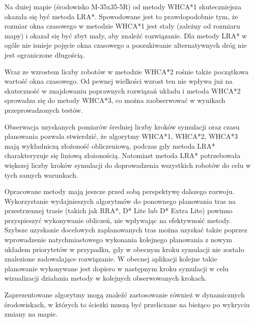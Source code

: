 Na dużej mapie (środowisko M-35x35-5R) od metody WHCA*1 skuteczniejsza okazała się być metoda LRA*. Spowodowane jest to prawdopodobnie tym, że rozmiar okna czasowego w metodzie WHCA*1 jest stały (zależny od rozmiaru mapy) i okazał się być zbyt mały, aby znaleźć rozwiązanie. Dla metody LRA* w ogóle nie isnieje pojęcie okna czasowego a poszukiwanie alternatywnych dróg nie jest ograniczone długością.

Wraz ze wzrostem liczby robotów w metodzie WHCA*2 rośnie także początkowa wartość okna czasowego.
Od pewnej wielkości wzrost ten nie wpływa już na skuteczność w znajdowaniu poprawnych rozwiązań układu i metoda WHCA*2 sprowadza się do metody WHCA*3, co można zaobserwować w wynikach przeprowadzonych testów.

Obserwacja uzyskanych pomiarów średniej liczby kroków symulacji oraz czasu planowania pozwala stwierdzić, że algorytmy WHCA*1, WHCA*2, WHCA*3 mają wykładniczą złożoność obliczeniową, podczas gdy metoda LRA* charakteryzuje się liniową złożonością.
Natomiast metoda LRA* potrzebowała większej liczby kroków symulacji do doprowadzenia wszystkich robotów do celu w tych samych warunkach.


Opracowane metody mają jeszcze przed sobą perspektywę dalszego rozwoju. Wykorzystanie wydajnieszych algorytmów do ponownego planowania tras na przestrzennej trasie (takich jak RRA*, D* Lite lub D* Extra Lite) powinno przyspieszyć wykonywanie obliczeń, nie wpływając na efektywność metody.
Szybsze uzyskanie docelowych zaplanowanych tras można uzyskać także poprzez wprowadzenie natychmiastowego wykonania kolejnego planowania z nowym układem priorytetów w przypadku, gdy w obecnym kroku symulacji nie zostało znalezione zadowalające rozwiązanie. W obecnej aplikacji kolejne takie planowanie wykonywane jest dopiero w następnym kroku symulacji w celu wizualizacji działania metody w kolejnych obserwowanych krokach.

Zaprezentowane algorytmy mogą znaleźć zastosowanie również w dynamicznych środowiskach, w których to ścieżki muszą być przeliczane na bieżąco po wykryciu zmiany na mapie.

